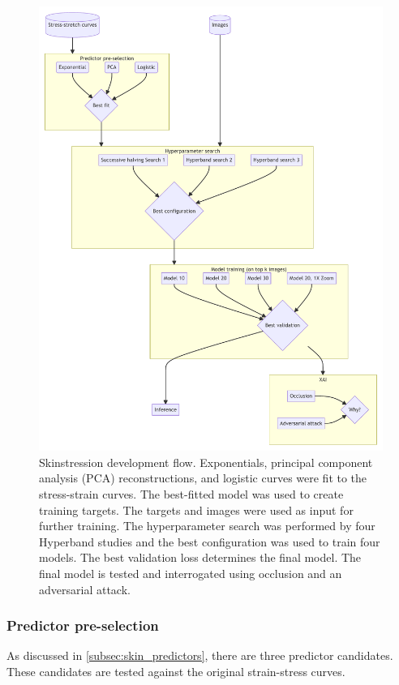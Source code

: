 \begin{figure}[p]
    \centering
    \includegraphics{mermaid/skin_analysis.pdf}
    \caption[Skinstression development flow]{
        Skinstression development flow.
        Exponentials, principal component analysis (PCA) reconstructions, and logistic curves were fit to the stress-strain curves.
        The best-fitted model was used to create training targets.
        The targets and images were used as input for further training.
        The hyperparameter search was performed by four Hyperband studies and the best configuration was used to train four models.
        The best validation loss determines the final model.
        The final model is tested and interrogated using occlusion and an adversarial attack.
    }
    \label{fig:skin_stat_methods}
\end{figure}

\subsubsection{Predictor pre-selection}
As discussed in \cref{subsec:skin_predictors}, there are three predictor candidates.
These candidates are tested against the original strain-stress curves.

